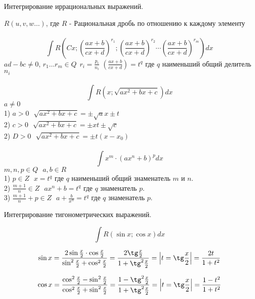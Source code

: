 \begin{title}[\Large]
  Интегрирование иррациональных выражений.
\end{title}

$R(u, v, w \ldots)$, где $R$ - Рациональная дробь по отношению к каждому
элементу\\

\\
\[
\int R \left( Cx; \left( \frac{ax + b}{cx + d} \right)^{r_1};
\left( \frac{ax + b}{cx + d} \right)^{r_2} \cdots
\left( \frac{ax + b}{cx + d} \right)^{r_m} \right)dx
\]
$ad - bc \neq 0$, $r_1 \ldots r_m\in Q ~~ r_i = \frac{p_i}{n_i}$
$\left( \frac{ax + b}{cx + d} \right) = t^q$ где $q$ наименьший общий делитель
  $n_i$\\

\\
\[\int R \left(x; \sqrt{ax^2 + bx + c} \right)dx\]
$a \neq 0$\\
1) $a > 0 ~~~ \sqrt{ax^2 + bx + c} = \pm \sqrt{a}x \pm t$\\
2) $c > 0 ~~~ \sqrt{ax^2 + bx + c} = \pm xt \pm \sqrt{c}$\\
2) $D > 0 ~~~ \sqrt{ax^2 + bx + c} = \pm t (x - x_0)$\\

\\
\[\int x^m \cdot (ax^n + b)^p dx\]
$m, n, p \in Q ~~~ a, b \in R$\\
1) $p \in Z ~~~ x = t^q$ где $q$ наименьший общий знаменатель $m$ и $n$.\\
2) $\frac{m+1}{n} \in Z ~~~ ax^n + b = t^q$ где $q$ знаменатель $p$.\\
3) $\frac{m+1}{n} + p \in Z ~~~ a + \frac{b}{x^n} = t^q$ где $q$ знаменатель
  $p$.\\

\begin{title}[\Large]
  Интегрирование тигонометрических выражений.
\end{title}

\[ \int R(\sin x; \cos x)dx \]

\[
  \sin x = \frac{2\sin \frac{x}{2} \cdot \cos \frac{x}{2}}{\sin^2 \frac{x}{2}
  + \cos^2 \frac{x}{2}} = \frac{2\tg \frac{x}{2}}{1 + \tg^2 \frac{x}{2}} =
  \left| t = \tg \frac{x}{2} \right| = \frac{2t}{1+t^2}
\]

\[
  \cos x = \frac{\cos^2 \frac{x}{2} - \sin^2 \frac{x}{2}}
  {\cos^2 \frac{x}{2} + \sin^2 \frac{x}{2}} =
  \frac{1 - \tg^2 \frac{x}{2}}{1 + \tg^2 \frac{x}{2}} =
  \left| t = \tg \frac{x}{2} \right| =
  \frac{1 - t^2}{1 + t^2}
\]

